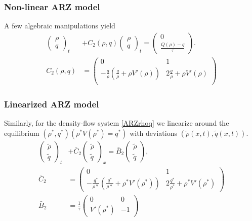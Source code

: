 \documentclass[a4paper, 10pt, conference]{ieeeconf}      %
\begin{document}
\subsubsection{Non-linear ARZ model}
A few algebraic manipulations yield
{\footnotesize
\begin{subequations}
\begin{align}
\begin{pmatrix}
	\rho \\
	q
\end{pmatrix}_t 
&+
C_2\left(\rho, q\right)
\begin{pmatrix}
	\rho \\ 
	q
\end{pmatrix}_t
=
\begin{pmatrix}
	0 \\ 
	\frac{Q(\rho) - q}{\tau}
\end{pmatrix}. \label{ARZrhoq} \\
C_2 \left(\rho, q \right)
&= 
\begin{pmatrix}
	0 & 1 \\
	- \frac{q}{\rho} \left( \frac{q}{\rho} + \rho V'\left( \rho \right) \right) & 2 \frac{q}{\rho} + \rho V'\left( \rho \right) \\
\end{pmatrix}
\end{align}
\end{subequations}
}

\subsubsection{Linearized ARZ model}
Similarly, for the density-flow system \eqref{ARZrhoq} we linearize around the equilibrium $(\rho^*, q^*)(\rho^*V(\rho^*) = q^*)$ with deviations $(\tilde{\rho}(x,t), \tilde{q}(x,t))$.
{\footnotesize
\begin{align}
\label{eq:rhoqlin}
\begin{pmatrix}
	\tilde{\rho} \\
	\tilde{q}
\end{pmatrix}_t
&+ \bar{C}_2
\begin{pmatrix}
	\tilde{\rho} \\ 
	\tilde{q}
\end{pmatrix}_x 
= 
\bar{B}_2
\begin{pmatrix}
	\tilde{\rho} \\
	\tilde{q}
\end{pmatrix}, \\
\bar{C}_2 &=
\begin{pmatrix}
	0 & 1 \\
	-\frac{q^{*}}{\rho{*}} \left(
		\frac{q^{*}}{\rho{*}} + \rho^{*} V'\left( \rho^{*} \right) \right) & 2 \frac{q^{*}}{\rho^{*}} + \rho^{*} V'\left( \rho^{*} \right)
\end{pmatrix} \\
\bar{B}_2 &=
\frac{1}{\tau}
\begin{pmatrix}
	0 & 0 \\
	V'\left( \rho^{*} \right) & -1
\end{pmatrix}
\end{align}
}
\end{document}
